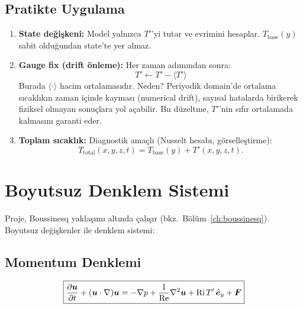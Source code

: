 \subsection{Pratikte Uygulama}

\begin{enumerate}
    \item \textbf{State değişkeni:} Model yalnızca $T'$'yi tutar ve evrimini hesaplar. $T_{\text{base}}(y)$ sabit olduğundan state'te yer almaz.

    \item \textbf{Gauge fix (drift önleme):} Her zaman adımından sonra:
    \begin{equation}
        T' \leftarrow T' - \langle T' \rangle
        \label{eq:gauge_fix}
    \end{equation}
    Burada $\langle \cdot \rangle$ hacim ortalamasıdır. Neden? Periyodik domain'de ortalama sıcaklıkın zaman içinde kayması (numerical drift), sayısal hatalarda birikerek fiziksel olmayan sonuçlara yol açabilir. Bu düzeltme, $T'$'nin sıfır ortalamada kalmasını garanti eder.

    \item \textbf{Toplam sıcaklık:} Diagnostik amaçlı (Nusselt hesabı, görselleştirme):
    \begin{equation}
        T_{\text{total}}(x, y, z, t) = T_{\text{base}}(y) + T'(x, y, z, t).
    \end{equation}
\end{enumerate}



\section{Boyutsuz Denklem Sistemi}
\label{sec:bizim_denklemler}

Proje, Boussinesq yaklaşımı altında çalışır (bkz.~Bölüm~\ref{ch:boussinesq}). Boyutsuz değişkenler ile denklem sistemi:

\subsection{Momentum Denklemi}
\begin{equation}
    \boxed{
        \frac{\partial \bm{u}}{\partial t} + (\bm{u} \cdot \nabla)\bm{u}
        = -\nabla p
        + \frac{1}{\mathrm{Re}} \nabla^2 \bm{u}
        + \mathrm{Ri} \, T' \, \hat{\bm{e}}_y
        + \bm{F}
    }
    \label{eq:momentum_bizim}
\end{equation}

